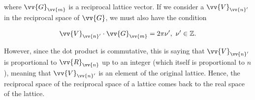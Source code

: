 \begin{parts}
  where $\vv{G}_{\vv{m}}$ is a reciprocal lattice vector. If we consider a $\vv{V}_{\vv{n}'}$ in the reciprocal space of $\vv{G}$, we must also have the condition

  \begin{equation}
    \vv{V}_{\vv{n}'} \cdot \vv{G}_{\vv{m}} = 2\pi\nu',\ \nu'\in\mathbb{Z}.
  \end{equation}

  However, since the dot product is commutative, this is saying that $\vv{V}_{\vv{n}'}$ is proportional to $\vv{R}_{\vv{n}}$ up to an integer (which itself is proportional to $n$), meaning that $\vv{V}_{\vv{n}'}$ is an element of the original lattice. Hence, the reciprocal space of the reciprocal space of a lattice comes back to the real space of the lattice.

  
  
\end{parts}


